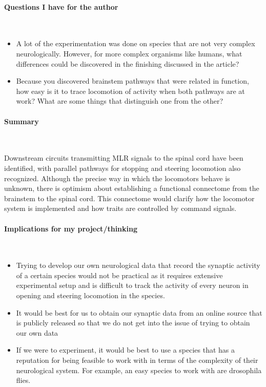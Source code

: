 \vspace*{-0.5cm}
\paragraph{Questions I have for the author} \ 

\begin{itemize}
    \item A lot of the experimentation was done on species that are not very complex neurologically. However, for more complex organisms like humans, what differences could be discovered in the finishing discussed in the article?
    \item Because you discovered brainstem pathways that were related in function, how easy is it to trace locomotion of activity when both pathways are at work? What are some things that distinguish one from the other? 
\end{itemize}

\vspace*{-0.5cm}
\paragraph{Summary} \

Downstream circuits transmitting MLR signals to the spinal cord have been identified, with parallel pathways for stopping and steering locomotion also recognized. Although the precise way in which  the locomotors behave is unknown, there is optimism about establishing a functional connectome from the brainstem to the spinal cord. This connectome would clarify how the locomotor system is implemented and how traits are controlled by command signals. 

\vspace*{-0.5cm}
\paragraph{Implications for my project/thinking} \

\begin{itemize}
    \item Trying to develop our own neurological data that record the synaptic activity of a certain species would not be practical as it requires extensive experimental setup and is difficult to track the activity of every neuron in opening and steering locomotion in the species. 
    \item It would be best for us to obtain our synaptic data from an online source that is publicly released so that we do not get into the issue of trying to obtain our own data 
    \item If we were to experiment, it would be best to use a species that has a reputation for being feasible to work with in terms of the complexity of their neurological system. For example, an easy species to work with are drosophila flies. 
\end{itemize}


